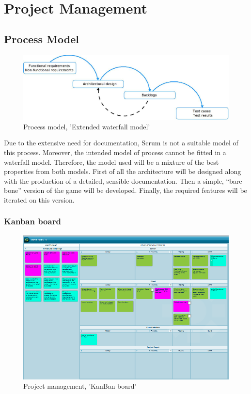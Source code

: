 \chapter{Project Management}

\section{Process Model}

\begin{figure}[H]
  \centering
    \includegraphics[width=1.0\textwidth]{img/waterfall.jpeg}
  \caption{Process model, 'Extended waterfall model'} 
  \label{fig:exwaterfall}
\end{figure}


Due to the extensive need for documentation, Scrum is not a suitable model of 
this process. Moreover, the intended model of process cannot be fitted in a 
waterfall model. Therefore, the model used will be a mixture of the best 
properties from both models. First of all the architecture will be designed 
along with the production of a detailed, sensible documentation. Then a simple, 
“bare bone” version of the game will be developed. Finally, the required 
features will be iterated on this version.


\subsection{Kanban board}

\begin{figure}[H]
  \centering
    \includegraphics[width=1.0\textwidth]{img/kanban.png}
  \caption{Project management, 'KanBan board'} 
  \label{fig:kanban}
\end{figure}

